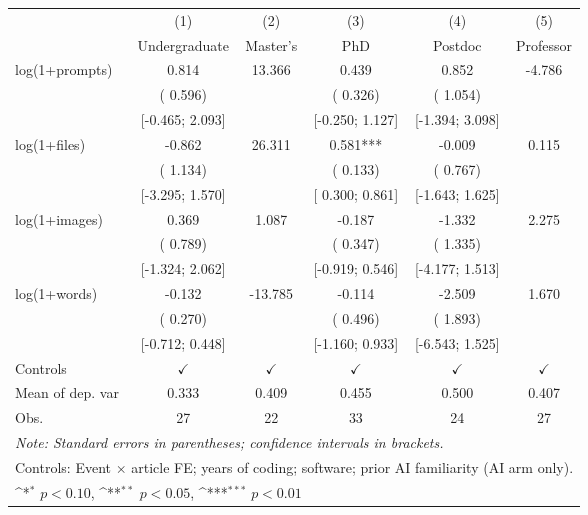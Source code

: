 \def\sym#1{\ifmmode^{#1}\else\(^{#1}\)\fi}
\begin{tabular}{l*{5}{c}}
\hline\hline
 & (1) & (2) & (3) & (4) & (5)
\\
 & Undergraduate & Master's & PhD & Postdoc & Professor
 \\
\hline
log(1+prompts) &  0.814 &  13.366 &  0.439 &  0.852 & -4.786
\\
 & ( 0.596) &  & ( 0.326) & ( 1.054) & 
\\
 & [-0.465;  2.093] &  & [-0.250;  1.127] & [-1.394;  3.098] & 
\\
log(1+files) & -0.862 &  26.311 &  0.581*** & -0.009 &  0.115
\\
 & ( 1.134) &  & ( 0.133) & ( 0.767) & 
\\
 & [-3.295;  1.570] &  & [ 0.300;  0.861] & [-1.643;  1.625] & 
\\
log(1+images) &  0.369 &  1.087 & -0.187 & -1.332 &  2.275
\\
 & ( 0.789) &  & ( 0.347) & ( 1.335) & 
\\
 & [-1.324;  2.062] &  & [-0.919;  0.546] & [-4.177;  1.513] & 
\\
log(1+words) & -0.132 & -13.785 & -0.114 & -2.509 &  1.670
\\
 & ( 0.270) &  & ( 0.496) & ( 1.893) & 
\\
 & [-0.712;  0.448] &  & [-1.160;  0.933] & [-6.543;  1.525] & 
\\
\hline
Controls & $\checkmark$ & $\checkmark$ & $\checkmark$ & $\checkmark$ & $\checkmark$
\\
Mean of dep. var &  0.333 &  0.409 &  0.455 &  0.500 &  0.407
\\
Obs. & 27 & 22 & 33 & 24 & 27
\\
\hline
\hline\hline
\multicolumn{6}{l}{\it{Note:} Standard errors in parentheses; confidence intervals in brackets.}\\
\multicolumn{6}{l}{Controls: Event $\times$ article FE; years of coding; software; prior AI familiarity (AI arm only).}\\
\multicolumn{6}{l}{\sym{*} $p<0.10$, \sym{**} $p<0.05$,  \sym{***} $p<0.01$}\\
\end{tabular}

